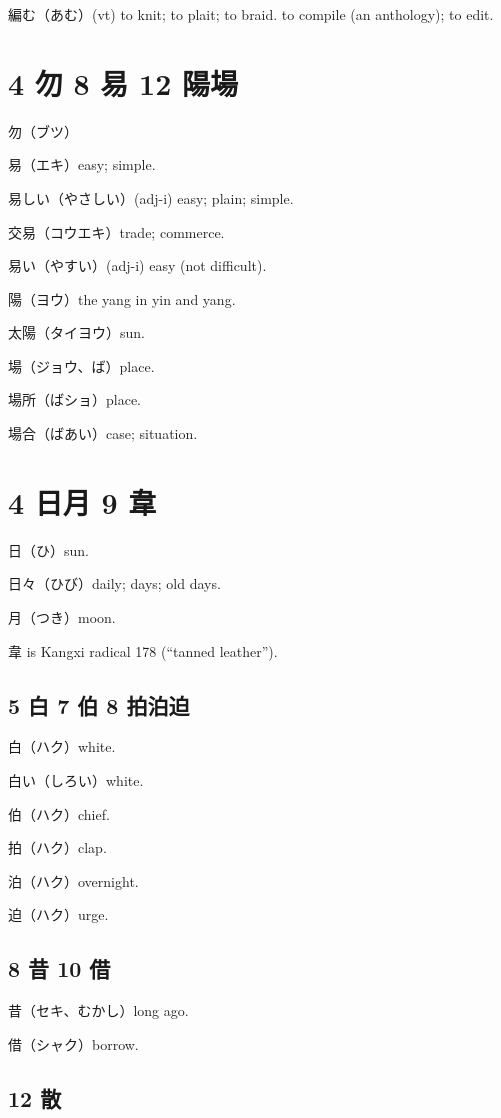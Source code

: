 編む（あむ）(vt)
to knit; to plait; to braid.
to compile (an anthology); to edit.

\section{4 勿 8 易 12 陽場}

勿（ブツ）

易（エキ）easy; simple.

易しい（やさしい）(adj-i) easy; plain; simple.

交易（コウエキ）trade; commerce.

易い（やすい）(adj-i) easy (not difficult).

陽（ヨウ）the yang in yin and yang.

太陽（タイヨウ）sun.

場（ジョウ、ば）place.

場所（ばショ）place.

場合（ばあい）case; situation.

\section{4 日月 9 韋}

日（ひ）sun.

日々（ひび）daily; days; old days.

月（つき）moon.

韋 is Kangxi radical 178 (``tanned leather'').

\subsection{5 白 7 伯 8 拍泊迫}

白（ハク）white.

白い（しろい）white.

伯（ハク）chief.

拍（ハク）clap.

泊（ハク）overnight.

迫（ハク）urge.

\subsection{8 昔 10 借}

昔（セキ、むかし）long ago.

借（シャク）borrow.

\subsection{12 散}

